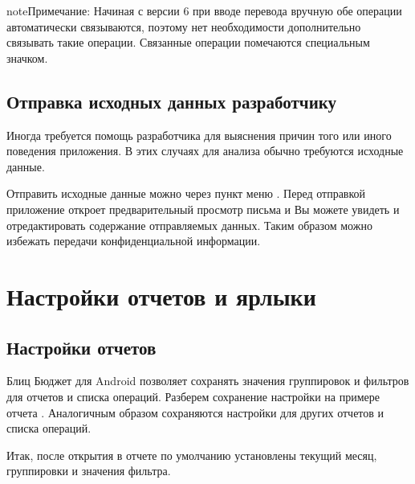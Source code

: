 \documentclass[a4paper,10pt,russian]{sphinxmanual}
\begin{document}
\noindent{}

\begin{sphinxadmonition}{note}{Примечание:}
\sphinxAtStartPar
Начиная с версии 6 при вводе перевода вручную обе операции автоматически связываются, поэтому нет
необходимости дополнительно связывать такие операции. Связанные операции помечаются специальным значком.
\end{sphinxadmonition}


\section{Отправка исходных данных разработчику}
\label{\detokenize{bulk-actions:id8}}
\sphinxAtStartPar
Иногда требуется помощь разработчика для выяснения причин того или иного поведения приложения. В этих
случаях для анализа обычно требуются исходные данные.

\sphinxAtStartPar
Отправить исходные данные можно через пункт меню . Перед отправкой
приложение откроет предварительный просмотр письма и Вы можете увидеть и отредактировать содержание
отправляемых данных. Таким образом можно избежать передачи конфиденциальной информации.

\noindent{}
\noindent{}

\sphinxstepscope


\chapter{Настройки отчетов и ярлыки}
\label{\detokenize{shortcuts:chapter-shortcuts}}\label{\detokenize{shortcuts:id1}}\label{\detokenize{shortcuts::doc}}

\section{Настройки отчетов}
\label{\detokenize{shortcuts:id2}}
\sphinxAtStartPar
Блиц Бюджет для Android позволяет сохранять значения группировок и фильтров для отчетов и списка операций. Разберем
сохранение настройки на примере отчета . Аналогичным образом сохраняются настройки
для других отчетов и списка операций.

\sphinxAtStartPar
Итак, после открытия в отчете по умолчанию установлены текущий месяц, группировки и значения фильтра.
\end{document}
